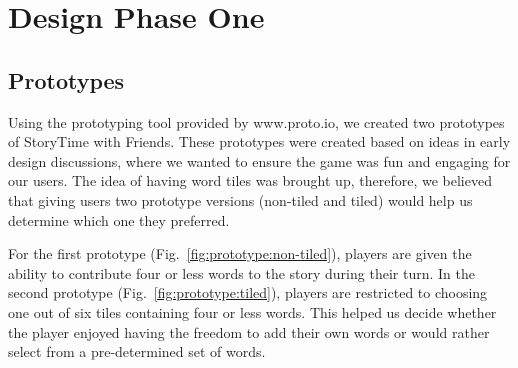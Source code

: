 \documentclass{sigchi}
\begin{document}
\section{Design Phase One} %

\subsection{Prototypes}
Using the prototyping tool provided by www.proto.io, we created two prototypes of StoryTime with Friends. These prototypes were created based on ideas in early design discussions, where we wanted to ensure the game was fun and engaging for our users. The idea of having word tiles was brought up, therefore, we believed that giving users two prototype versions (non-tiled and tiled) would help us determine which one they preferred. 

For the first prototype (Fig.~\ref{fig:prototype:non-tiled}), players are given the ability to contribute four or less words to the story during their turn. In the second prototype (Fig.~\ref{fig:prototype:tiled}), players are restricted to choosing one out of six tiles containing four or less words. This helped us decide whether the player enjoyed having the freedom to add their own words or would rather select from a pre-determined set of words.   
\end{document}
